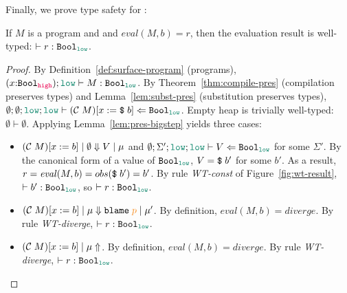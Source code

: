 Finally, we prove type safety for \Surface:

\begin{theorem}
  \label{thm:type-safety}
  If $M$ is a \Surface program and
  and $\mathit{eval}(M,b)=r$,
  then the evaluation result is well-typed: $\vdash r : \Bool_{\low}$.
\end{theorem}
\begin{proof}
  By Definition~\ref{def:surface-program} (\Surface programs),
  $(x{:}\Bool_{\high});\low \vdash M : \Bool_{\low}$. By
  Theorem~\ref{thm:compile-pres} (compilation preserves types) and
  Lemma~\ref{lem:subst-pres} (substitution preserves types), $\emptyset ;
  \emptyset ; \low ; \low \vdash (\compile{M})[x:=\ccconst{b}] \Leftarrow
  \Bool_{\low}$. Empty heap is trivially well-typed: $\emptyset \vdash
  \emptyset$. Applying Lemma~\ref{lem:pres-bigstep} yields three cases:
  \begin{itemize}
  \item $(\mathcal{C}\;{M})[x:=b] \mid \emptyset \Downarrow V \mid \mu$ and $\emptyset ; \Sigma' ; \low
    ; \low \vdash V \Leftarrow \Bool_{\low}$ for some $\Sigma'$. By the
    canonical form of a value of $\Bool_{\low}$, $V = \text{\texttt{{\$}}}\;{b'}$ for some
    $b'$. As a result, $r=\mathit{eval}(M,b)=obs(\text{\texttt{{\$}}}\;{b'})=b'$. By rule
    \textit{WT-const} of Figure~\ref{fig:wt-result}, $\vdash b' : \Bool_{\low}$,
    so $\vdash r : \Bool_{\low}$.
  \item $(\compile{M})[x:=b] \mid \mu \Downarrow \blame{p} \mid \mu'$. By
    definition, $\mathit{eval}(M,b)=\mathit{diverge}$. By rule
    \textit{WT-diverge}, $\vdash r : \Bool_{\low}$.
  \item $(\mathcal{C}\;{M})[x:=b] \mid \mu \Uparrow$. By
    definition, $\mathit{eval}(M,b)=\mathit{diverge}$. By rule
    \textit{WT-diverge}, $\vdash r : \Bool_{\low}$.
  \end{itemize}
\end{proof}
